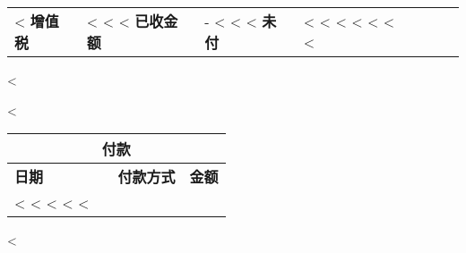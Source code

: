 \begin{CJK}{UTF8}{arialuni}
{\begin{longtable}{|ll p{5.5cm} @{\extracolsep\fill} lrlr|}
   <%
     \multicolumn{6}{|lr} \textbf{增值税} & <%
   <%
   <%
     \multicolumn{2}{|lr} \textbf{已收金额}  & - <%
   <%
   <%
     \hline
     \multicolumn{6}{|rr} \textbf{未付} & <%
   <%
  \hline
\endlastfoot
<%
  <%
  <%
  <%
<%
\end{longtable}

\vspace{1.5cm}

<%
}

\vfill

<%
\begin{tabularx}{10cm}{@{}lXlr@{}}
  \multicolumn{4}{c}{\textbf{付款}} \\
  \hline
  \textbf{日期} & & \textbf{付款方式} & \textbf{金额} \\
<%
<%
  <%
<%
<%
\end{tabularx}
<%

\vfill

\end{CJK}  


